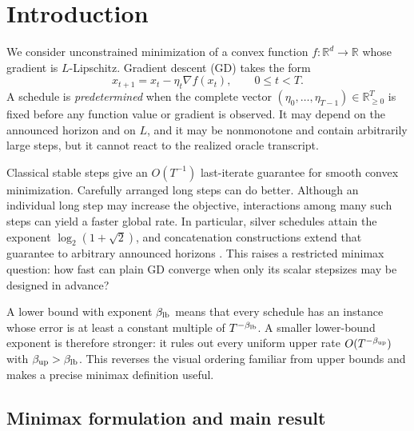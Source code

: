 \documentclass[11pt]{article}
\theoremstyle{definition}
\theoremstyle{remark}
\newcommand{\R}{\mathbb{R}}
\begin{document}
\section{Introduction}
\label{sec:introduction}

We consider unconstrained minimization of a convex function
\(f:\R^d\to\R\) whose gradient is \(L\)-Lipschitz.  Gradient descent (GD)
takes the form
\begin{equation}
 x_{t+1}=x_t-\eta_t\nabla f(x_t),
 \qquad 0\le t<T.
 \label{eq:physical-gd}
\end{equation}
A schedule is \emph{predetermined} when the complete vector
\((\eta_0,\ldots,\eta_{T-1})\in\R_{\ge0}^T\) is fixed before any function
value or gradient is observed.  It may depend on the announced horizon and
on \(L\), and it may be nonmonotone and contain arbitrarily large steps, but
it cannot react to the realized oracle transcript.

Classical stable steps give an \(O(T^{-1})\) last-iterate guarantee for
smooth convex minimization.  Carefully arranged long steps can do better.
Although an individual long step may increase the objective, interactions
among many such steps can yield a faster global rate.  In particular, silver
schedules attain the exponent \(\log_2(1+\sqrt2)\), and concatenation
constructions extend that guarantee to arbitrary announced horizons
\cite{altschuler2025silver,zhangjiang2024}.  This raises a restricted
minimax question: how fast can plain GD converge when only its scalar
stepsizes may be designed in advance?

A lower bound with exponent \(\beta_{\rm lb}\) means that every schedule
has an instance whose error is at least a constant multiple of
\(T^{-\beta_{\rm lb}}\).  A smaller lower-bound exponent is therefore
stronger: it rules out every uniform upper rate
\(O(T^{-\beta_{\rm up}})\) with
\(\beta_{\rm up}>\beta_{\rm lb}\).  This reverses the visual ordering
familiar from upper bounds and makes a precise minimax definition useful.

\subsection{Minimax formulation and main result}
\end{document}
